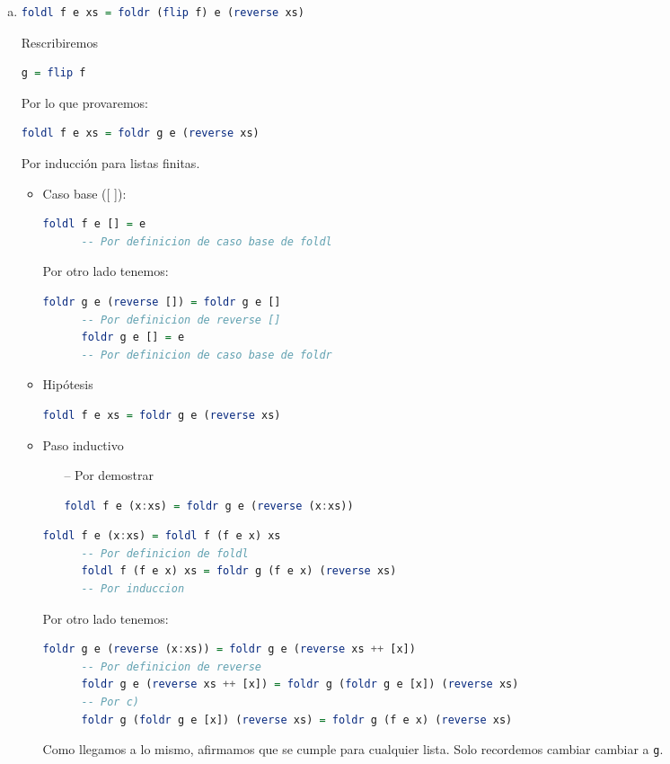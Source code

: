 \documentclass[spanish,12pt,letterpaper]{article}
\begin{document}
\begin{enumerate}[(a)]
\item
  \begin{lstlisting}[language=Haskell]
    foldl f e xs = foldr (flip f) e (reverse xs)
  \end{lstlisting}
  Rescribiremos
  \begin{lstlisting}[language=Haskell]
    g = flip f
  \end{lstlisting}
  Por lo que provaremos:
  \begin{lstlisting}[language=Haskell]
    foldl f e xs = foldr g e (reverse xs)
  \end{lstlisting}
  Por inducción para listas finitas.
  \begin{itemize}
  \item Caso base ([ ]):
    \begin{lstlisting}[language=Haskell]
      foldl f e [] = e
      -- Por definicion de caso base de foldl
    \end{lstlisting}
    Por otro lado tenemos:
    \begin{lstlisting}[language=Haskell]
      foldr g e (reverse []) = foldr g e []
      -- Por definicion de reverse []
      foldr g e [] = e
      -- Por definicion de caso base de foldr
    \end{lstlisting}
  \item Hipótesis
    \begin{lstlisting}[language=Haskell]
      foldl f e xs = foldr g e (reverse xs)
    \end{lstlisting}
  \item Paso inductivo
    \begin{itemize}
    \item [--] Por demostrar
      \begin{lstlisting}[language=Haskell]
        foldl f e (x:xs) = foldr g e (reverse (x:xs))
      \end{lstlisting}
    \end{itemize}
    \begin{lstlisting}[language=Haskell]
      foldl f e (x:xs) = foldl f (f e x) xs
      -- Por definicion de foldl
      foldl f (f e x) xs = foldr g (f e x) (reverse xs)
      -- Por induccion
    \end{lstlisting}
    Por otro lado tenemos:
    \begin{lstlisting}[language=Haskell]
      foldr g e (reverse (x:xs)) = foldr g e (reverse xs ++ [x])
      -- Por definicion de reverse
      foldr g e (reverse xs ++ [x]) = foldr g (foldr g e [x]) (reverse xs)
      -- Por c)
      foldr g (foldr g e [x]) (reverse xs) = foldr g (f e x) (reverse xs)
    \end{lstlisting}
    Como llegamos a lo mismo, afirmamos que se cumple para cualquier lista. Solo
    recordemos cambiar cambiar a \texttt{g}.
  \end{itemize}


\end{enumerate}
\end{document}

